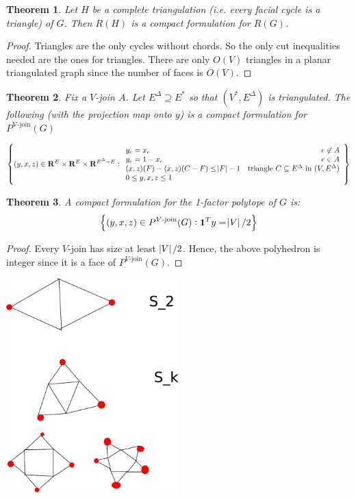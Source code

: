 \documentclass{article}
\newtheorem{theorem}{Theorem}
\begin{document}
\begin{theorem}
Let $H$ be a complete triangulation (i.e. every facial cycle is a triangle) of $G$. Then  $R(H)$ is a compact formulation for $R(G)$.
\end{theorem}
\begin{proof}
Triangles are the only cycles without chords. So
the only cut inequalities needed are the ones for triangles. 
There are only $O(V)$ triangles in a planar triangulated graph since the number of faces is $O(V)$. 
\end{proof}


\begin{theorem}
Fix a $V$-join $A$.
Let $E^\Delta\supseteq E^*$ so that $(V^*, E^\Delta)$ is triangulated.
The following (with the projection map onto $y$) is a compact formulation for $P^{\text{V-join}}(G)$

$$\cbr{(y,x,z)\in\mathbf{R}^E\times\mathbf{R}^E\times\mathbf{R}^{E^\Delta-E}:
\begin{array}{lr}
y_e = x_e & e\not\in A \\
y_e = 1-x_e & e\in A \\
	(x,z)(F) - (x,z)(C-F) \leq \abs{F}-1 & \text{triangle $C \subseteq E^\Delta$ in $(V,E^\Delta)$} \\
0 \leq y,x,z \leq 1
\end{array}
}$$
\end{theorem}

\begin{theorem}
A compact formulation for the 1-factor polytope of $G$ is:
	$$\cbr{(y,x,z) \in P^{\text{$V$-join}}(G): \mathbf{1}^Ty = \abs{V}/2}$$
\end{theorem}
\begin{proof}
	Every $V$-join has size at least $\abs{V}/2$. Hence,
	the above polyhedron is integer since it is a face of $P^{\text{$V$-join}}(G)$.
\end{proof}

	\includegraphics[width=0.5\textwidth]{gadgets}
\end{document}
